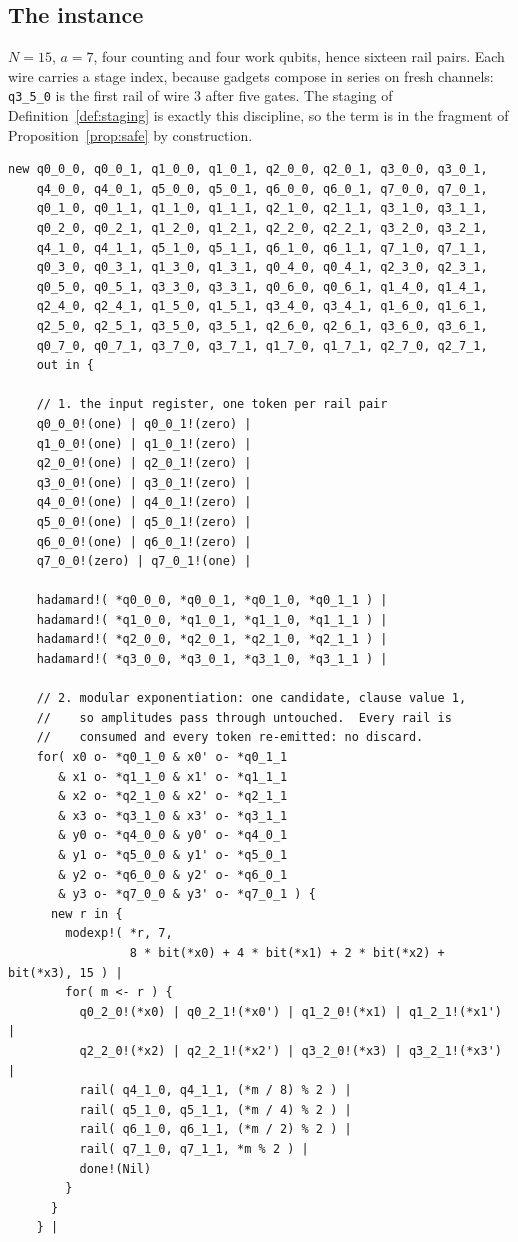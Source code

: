 \documentclass[11pt,a4paper]{article}
\theoremstyle{plain}
\theoremstyle{definition}
\theoremstyle{remark}
\begin{document}
\subsection{The instance}

$N = 15$, $a = 7$, four counting and four work qubits, hence sixteen rail pairs.
Each wire carries a stage index, because gadgets compose in series on fresh
channels: \texttt{q3\_5\_0} is the first rail of wire $3$ after five gates. The
staging of Definition~\ref{def:staging} is exactly this discipline, so the term
is in the fragment of Proposition~\ref{prop:safe} by construction.

\begin{lstlisting}
new q0_0_0, q0_0_1, q1_0_0, q1_0_1, q2_0_0, q2_0_1, q3_0_0, q3_0_1,
    q4_0_0, q4_0_1, q5_0_0, q5_0_1, q6_0_0, q6_0_1, q7_0_0, q7_0_1,
    q0_1_0, q0_1_1, q1_1_0, q1_1_1, q2_1_0, q2_1_1, q3_1_0, q3_1_1,
    q0_2_0, q0_2_1, q1_2_0, q1_2_1, q2_2_0, q2_2_1, q3_2_0, q3_2_1,
    q4_1_0, q4_1_1, q5_1_0, q5_1_1, q6_1_0, q6_1_1, q7_1_0, q7_1_1,
    q0_3_0, q0_3_1, q1_3_0, q1_3_1, q0_4_0, q0_4_1, q2_3_0, q2_3_1,
    q0_5_0, q0_5_1, q3_3_0, q3_3_1, q0_6_0, q0_6_1, q1_4_0, q1_4_1,
    q2_4_0, q2_4_1, q1_5_0, q1_5_1, q3_4_0, q3_4_1, q1_6_0, q1_6_1,
    q2_5_0, q2_5_1, q3_5_0, q3_5_1, q2_6_0, q2_6_1, q3_6_0, q3_6_1,
    q0_7_0, q0_7_1, q3_7_0, q3_7_1, q1_7_0, q1_7_1, q2_7_0, q2_7_1,
    out in {

    // 1. the input register, one token per rail pair
    q0_0_0!(one) | q0_0_1!(zero) |
    q1_0_0!(one) | q1_0_1!(zero) |
    q2_0_0!(one) | q2_0_1!(zero) |
    q3_0_0!(one) | q3_0_1!(zero) |
    q4_0_0!(one) | q4_0_1!(zero) |
    q5_0_0!(one) | q5_0_1!(zero) |
    q6_0_0!(one) | q6_0_1!(zero) |
    q7_0_0!(zero) | q7_0_1!(one) |

    hadamard!( *q0_0_0, *q0_0_1, *q0_1_0, *q0_1_1 ) |
    hadamard!( *q1_0_0, *q1_0_1, *q1_1_0, *q1_1_1 ) |
    hadamard!( *q2_0_0, *q2_0_1, *q2_1_0, *q2_1_1 ) |
    hadamard!( *q3_0_0, *q3_0_1, *q3_1_0, *q3_1_1 ) |

    // 2. modular exponentiation: one candidate, clause value 1,
    //    so amplitudes pass through untouched.  Every rail is
    //    consumed and every token re-emitted: no discard.
    for( x0 o- *q0_1_0 & x0' o- *q0_1_1
       & x1 o- *q1_1_0 & x1' o- *q1_1_1
       & x2 o- *q2_1_0 & x2' o- *q2_1_1
       & x3 o- *q3_1_0 & x3' o- *q3_1_1
       & y0 o- *q4_0_0 & y0' o- *q4_0_1
       & y1 o- *q5_0_0 & y1' o- *q5_0_1
       & y2 o- *q6_0_0 & y2' o- *q6_0_1
       & y3 o- *q7_0_0 & y3' o- *q7_0_1 ) {
      new r in {
        modexp!( *r, 7,
                 8 * bit(*x0) + 4 * bit(*x1) + 2 * bit(*x2) + bit(*x3), 15 ) |
        for( m <- r ) {
          q0_2_0!(*x0) | q0_2_1!(*x0') | q1_2_0!(*x1) | q1_2_1!(*x1') |
          q2_2_0!(*x2) | q2_2_1!(*x2') | q3_2_0!(*x3) | q3_2_1!(*x3') |
          rail( q4_1_0, q4_1_1, (*m / 8) % 2 ) |
          rail( q5_1_0, q5_1_1, (*m / 4) % 2 ) |
          rail( q6_1_0, q6_1_1, (*m / 2) % 2 ) |
          rail( q7_1_0, q7_1_1, *m % 2 ) |
          done!(Nil)
        }
      }
    } |


\end{lstlisting}
\end{document}
